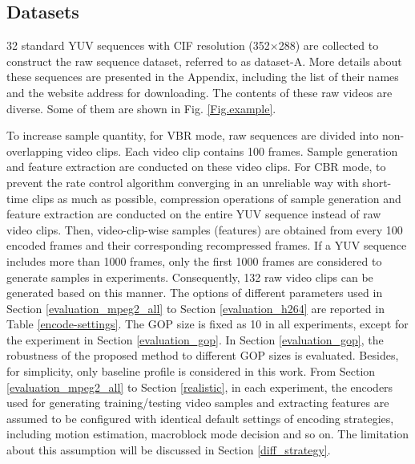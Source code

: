 \documentclass[journal,sort]{IEEEtran}
\begin{document}
\subsection{Datasets\label{dataset_video}}
32 standard YUV sequences with CIF resolution (352$\times$288) are collected to construct the raw sequence dataset, referred to as dataset-A. More details about these sequences are presented in the Appendix, including the list of their names and the website address for downloading. The contents of these raw videos are diverse. Some of them are shown in Fig. \ref{Fig.example}. 


To increase sample quantity, for VBR mode, raw sequences are divided into non-overlapping video clips. Each video clip contains 100 frames. Sample generation and feature extraction are conducted on these video clips. For CBR mode, to prevent the rate control algorithm converging in an unreliable way with short-time clips as much as possible, compression operations of sample generation and feature extraction are conducted on the entire YUV sequence instead of raw video clips. Then, video-clip-wise samples (features) are obtained from every 100 encoded frames and their corresponding recompressed frames. If a YUV sequence includes more than 1000 frames, only the first 1000 frames are considered to generate samples in experiments. Consequently, 132 raw video clips can be generated based on this manner. The options of different parameters used in Section \ref{evaluation_mpeg2_all} to Section \ref{evaluation_h264} are reported in Table \ref{encode-settings}. The GOP size is fixed as 10 in all experiments, except for the experiment in Section \ref{evaluation_gop}. In Section \ref{evaluation_gop}, the robustness of the proposed method to different GOP sizes is evaluated. Besides, for simplicity, only baseline profile is considered in this work. From Section \ref{evaluation_mpeg2_all} to Section \ref{realistic}, in each experiment, the encoders used for generating training/testing video samples and extracting features are assumed to be configured with identical default settings of encoding strategies, including motion estimation, macroblock mode decision and so on. The limitation about this assumption will be discussed in Section \ref{diff_strategy}.
\end{document}
